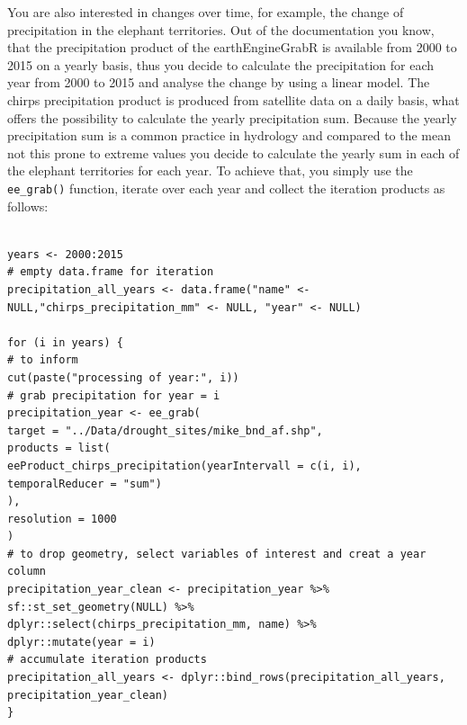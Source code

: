 You are also interested in changes over time, for example, the change of precipitation in the elephant territories. Out of the documentation you know, that the precipitation product of the earthEngineGrabR is available from 2000 to 2015 on a yearly basis, thus you decide to calculate the precipitation for each year from 2000 to 2015 and analyse the change by using a linear model. The chirps precipitation product is produced from satellite data on a daily basis, what offers the possibility to calculate the yearly precipitation sum. Because the yearly precipitation sum is a common practice in hydrology and compared to the mean not this prone to extreme values you decide to calculate the yearly sum in each of the elephant territories for each year. To achieve that, you simply use the \texttt{ee\_grab()} function, iterate over each year and collect the iteration products as follows:

\begin{lstlisting}

years <- 2000:2015
# empty data.frame for iteration
precipitation_all_years <- data.frame("name" <- NULL,"chirps_precipitation_mm" <- NULL, "year" <- NULL)

for (i in years) {
# to inform
cut(paste("processing of year:", i))
# grab precipitation for year = i
precipitation_year <- ee_grab(
target = "../Data/drought_sites/mike_bnd_af.shp",
products = list(
eeProduct_chirps_precipitation(yearIntervall = c(i, i), temporalReducer = "sum")
),
resolution = 1000
)
# to drop geometry, select variables of interest and creat a year column
precipitation_year_clean <- precipitation_year %>% 
sf::st_set_geometry(NULL) %>% 
dplyr::select(chirps_precipitation_mm, name) %>% 
dplyr::mutate(year = i)
# accumulate iteration products
precipitation_all_years <- dplyr::bind_rows(precipitation_all_years, precipitation_year_clean)
}
\end{lstlisting}




